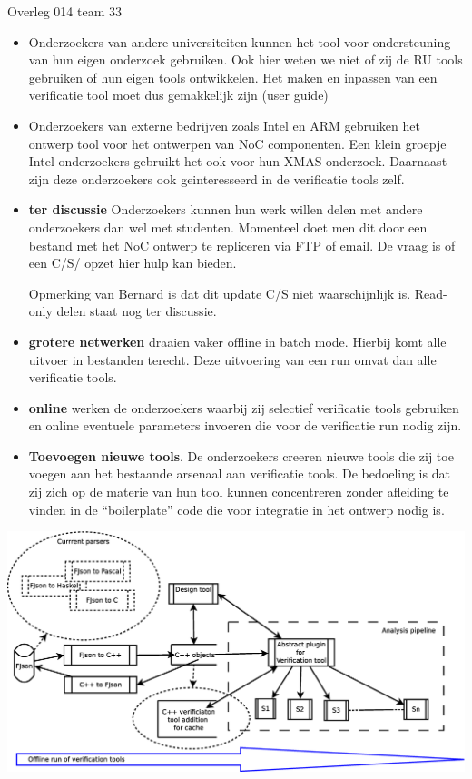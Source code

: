 \documentclass[a4paper,final]{article}
\begin{document}
\begin{Minutes}{Overleg 014 team 33}
\begin{itemize}
	\item Onderzoekers van andere universiteiten kunnen het tool voor
		ondersteuning van hun eigen onderzoek gebruiken. Ook hier weten we niet
		of zij de RU tools gebruiken of hun eigen tools ontwikkelen. Het maken
		en inpassen van een verificatie tool moet dus gemakkelijk zijn (user
		guide)

	\item Onderzoekers van externe bedrijven zoals Intel en ARM gebruiken het
		ontwerp tool voor het ontwerpen van NoC componenten. Een klein groepje
		Intel onderzoekers gebruikt het ook voor hun XMAS onderzoek. Daarnaast
		zijn deze onderzoekers ook geinteresseerd in de verificatie tools zelf.

	\item {\bf ter discussie} Onderzoekers kunnen hun werk willen delen met
		andere onderzoekers dan wel met studenten. Momenteel doet men dit door
		een bestand met het NoC ontwerp te repliceren via FTP of email. De
		vraag is of een C/S/ opzet hier hulp kan bieden. 

		Opmerking van Bernard is dat dit update C/S niet waarschijnlijk is.
		Read-only delen staat nog ter discussie.

	\item {\bf grotere netwerken} draaien vaker offline in batch mode. Hierbij
		komt alle uitvoer in bestanden terecht. Deze uitvoering van een run
		omvat dan alle verificatie tools.

	\item {\bf online} werken de onderzoekers waarbij zij selectief verificatie
		tools gebruiken en online eventuele parameters invoeren die voor de
		verificatie run nodig zijn.

	\item {\bf Toevoegen nieuwe tools}. De onderzoekers creeren nieuwe tools
		die zij toe voegen aan het bestaande arsenaal aan verificatie tools. De
		bedoeling is dat zij zich op de materie van hun tool kunnen
		concentreren zonder afleiding te vinden in de ``boilerplate'' code die
		voor integratie in het ontwerp nodig is. 

\end{itemize}		


\begin{center}
	\includegraphics[width=.9\linewidth]{2014-11-27-meeting-architecture-tool}
	\label{fig:architecture-high-level}
\end{center}


\end{Minutes}
\end{document}
